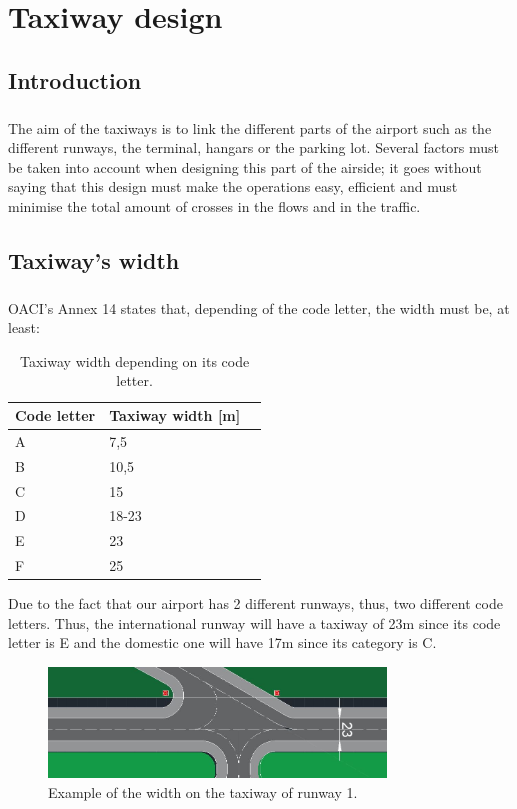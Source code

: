 \chapter{Taxiway design}
	
	\section{Introduction}
	\paragraph{}The aim of the taxiways is to link the different parts of the airport such as the different runways, the terminal, hangars or the parking lot. Several factors must be taken into account when designing this part of the airside; it goes without saying that this design must make the operations easy, efficient and must minimise the total amount of crosses in the flows and in the traffic.
	
	\section{Taxiway's width}
	\paragraph{}OACI’s Annex 14 states that, depending of the code letter, the width must be, at least:
	
	\begin{table}[htb]
		\centering
		\begin{tabular}{ll p{5cm}}
			\toprule[2pt]
			Code letter & Taxiway width [m]\\
			\midrule[1pt]
			A & 7,5\\
			B & 10,5 \\
			C & 15\\
			D & 18-23\\
			E & 23\\
			F & 25\\
			\bottomrule[2pt]
		\end{tabular}
		\caption{Taxiway width depending on its code letter.}
		\label{}
	\end{table}
	
	Due to the fact that our airport has 2 different runways, thus, two different code letters. Thus, the international runway will have a taxiway of 23m since its code letter is E and the domestic one will have 17m since its category is C.
	
	\begin{figure}[H]
		\centering
		\includegraphics[clip, trim=0.03cm 0cm 0cm 0.03cm, width=0.8\textwidth]{./images/taxiway/width1}
		\caption{Example of the width on the taxiway of runway 1.} %
		\label{} %
	\end{figure}

